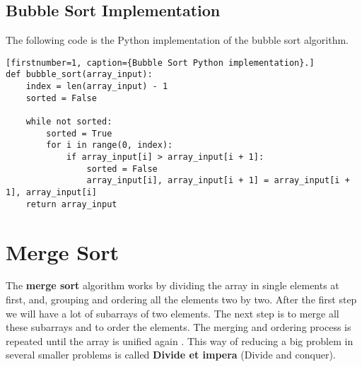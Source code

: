 \subsection{Bubble Sort Implementation}
The following code is the Python implementation of the bubble sort algorithm.
\begin{lstlisting}[firstnumber=1, caption={Bubble Sort Python implementation}.]
def bubble_sort(array_input):
	index = len(array_input) - 1
	sorted = False
	
	while not sorted:
		sorted = True
		for i in range(0, index):
			if array_input[i] > array_input[i + 1]:
				sorted = False
				array_input[i], array_input[i + 1] = array_input[i + 1], array_input[i]
	return array_input
\end{lstlisting}

\section{Merge Sort}
The \textbf{merge sort} algorithm works by dividing the array in single elements at first, and, grouping and ordering all the elements two by two. After the first step we will have a lot of subarrays of two elements. The next step is to merge all these subarrays and to order the elements. The merging and ordering process is repeated until the array is unified again \cite{wikimergesort}. This way of reducing a big problem in several smaller problems is called \textbf{Divide et impera} (Divide and conquer).

